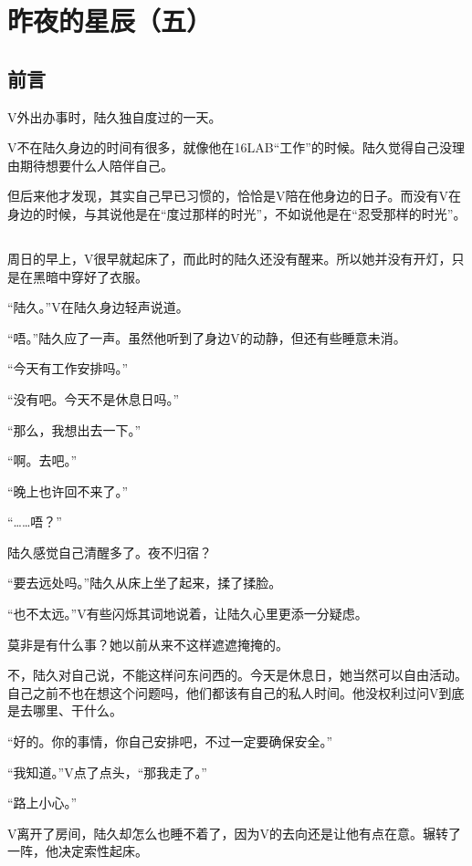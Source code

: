 \chapter{昨夜的星辰（五）}

\section*{前言}
V外出办事时，陆久独自度过的一天。

V不在陆久身边的时间有很多，就像他在16LAB“工作”的时候。陆久觉得自己没理由期待想要什么人陪伴自己。

但后来他才发现，其实自己早已习惯的，恰恰是V陪在他身边的日子。而没有V在身边的时候，与其说他是在“度过那样的时光”，不如说他是在“忍受那样的时光”。

\lineseparator

\section*{}

周日的早上，V很早就起床了，而此时的陆久还没有醒来。所以她并没有开灯，只是在黑暗中穿好了衣服。

“陆久。”V在陆久身边轻声说道。

“唔。”陆久应了一声。虽然他听到了身边V的动静，但还有些睡意未消。

“今天有工作安排吗。”

“没有吧。今天不是休息日吗。”

“那么，我想出去一下。”

“啊。去吧。”

“晚上也许回不来了。”

“……唔？”

陆久感觉自己清醒多了。夜不归宿？

“要去远处吗。”陆久从床上坐了起来，揉了揉脸。

“也不太远。”V有些闪烁其词地说着，让陆久心里更添一分疑虑。

莫非是有什么事？她以前从来不这样遮遮掩掩的。

不，陆久对自己说，不能这样问东问西的。今天是休息日，她当然可以自由活动。自己之前不也在想这个问题吗，他们都该有自己的私人时间。他没权利过问V到底是去哪里、干什么。

“好的。你的事情，你自己安排吧，不过一定要确保安全。”

“我知道。”V点了点头，“那我走了。”

“路上小心。”

V离开了房间，陆久却怎么也睡不着了，因为V的去向还是让他有点在意。辗转了一阵，他决定索性起床。

